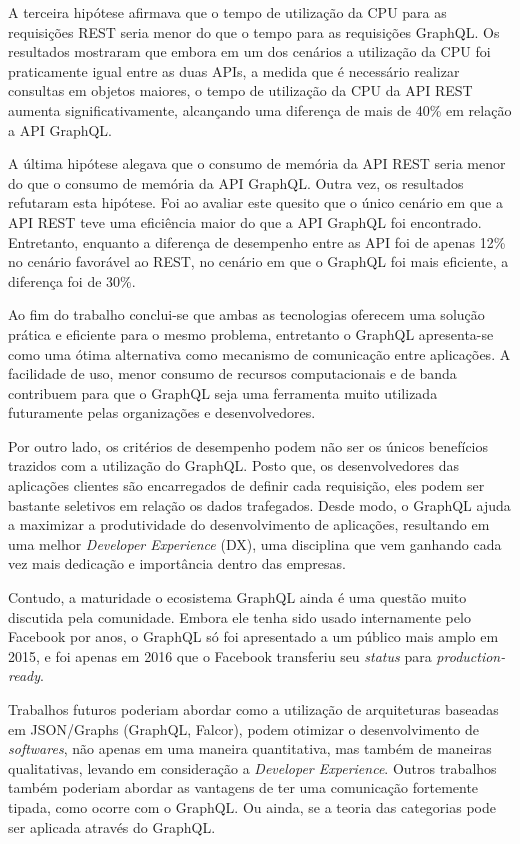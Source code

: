 A terceira hipótese afirmava que o tempo de utilização da CPU para as requisições REST seria menor do que o tempo para as requisições GraphQL. Os resultados mostraram que embora em um dos cenários a utilização da CPU foi praticamente igual entre as duas APIs, a medida que é necessário realizar consultas em objetos maiores, o tempo de utilização da CPU da API REST aumenta significativamente, alcançando uma diferença de mais de 40\% em relação a API GraphQL.

A última hipótese alegava que o consumo de memória da API REST seria menor do que o consumo de memória da API GraphQL. Outra vez, os resultados refutaram esta hipótese. Foi ao avaliar este quesito que o único cenário em que a API REST teve uma eficiência maior do que a API GraphQL foi encontrado. Entretanto, enquanto a diferença de desempenho entre as API foi de apenas 12\% no cenário favorável ao REST, no cenário em que o GraphQL foi mais eficiente, a diferença foi de 30\%. 

Ao fim do trabalho conclui-se que ambas as tecnologias oferecem uma solução prática e eficiente para o mesmo problema, entretanto o GraphQL apresenta-se como uma ótima alternativa como mecanismo de comunicação entre aplicações. A facilidade de uso, menor consumo de recursos computacionais e de banda contribuem para que o GraphQL seja uma ferramenta muito utilizada futuramente pelas organizações e desenvolvedores. 

Por outro lado, os critérios de desempenho podem não ser os únicos benefícios trazidos com a utilização do GraphQL. Posto que, os desenvolvedores das aplicações clientes são encarregados de definir cada requisição, eles podem ser bastante seletivos em relação os dados trafegados. Desde modo, o GraphQL ajuda a maximizar a produtividade do desenvolvimento de aplicações, resultando em uma melhor \textit{Developer Experience} (DX), uma disciplina que vem ganhando cada vez mais dedicação e importância dentro das empresas.

Contudo, a maturidade o ecosistema GraphQL ainda é uma questão muito discutida pela comunidade. Embora ele tenha sido usado internamente pelo Facebook por anos, o GraphQL só foi apresentado a um público mais amplo em 2015, e foi apenas em 2016 que o Facebook transferiu seu \textit{status} para \textit{production-ready}.

Trabalhos futuros poderiam abordar como a utilização de arquiteturas baseadas em JSON/Graphs (GraphQL, Falcor), podem otimizar o desenvolvimento de \textit{softwares}, não apenas em uma maneira quantitativa, mas também de maneiras qualitativas, levando em consideração a \textit{Developer Experience}. Outros trabalhos também poderiam abordar as vantagens de ter uma comunicação fortemente tipada, como ocorre com o GraphQL. Ou ainda, se a teoria das categorias pode ser aplicada através do GraphQL.

